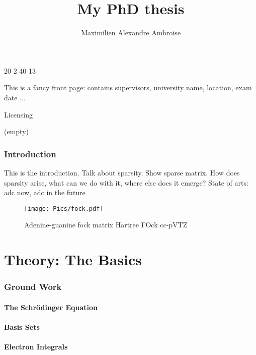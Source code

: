 \documentclass{article}
\begin{document}
20 2
40 13


\author{Maximilien Alexandre Ambroise}
\title{My PhD thesis}

\maketitle

This is a fancy front page: contains supervisors, university name, location, exam date ...

\newpage

Licensing

\newpage

(empty)

\newpage

\tableofcontents

\newpage

\section{Introduction}

This is the introduction. Talk about sparsity. Show sparse matrix. How does sparsity arise, what can we do with it, where else does it emerge?
State of arts: adc now, adc in the future

\begin{figure}
\centering
\texttt{[image: Pics/fock.pdf]}
\caption{Adenine-guanine fock matrix Hartree FOck cc-pVTZ}
\label{SparseExample}
\end{figure}

\newpage

\part{Theory: The Basics}

\section{Ground Work}

\subsection{The Schrödinger Equation}

\subsection{Basis Sets}

\subsection{Electron Integrals}
\end{document}

